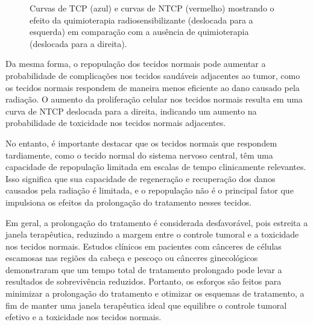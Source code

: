 \documentclass[11pt,a4paper]{article}
\begin{document}
	\begin{figure}[h]
		\centering
		\caption{Curvas de TCP (azul) e curvas de NTCP (vermelho) mostrando o efeito da quimioterapia radiosensibilizante (deslocada para a esquerda) em comparação com a ausência de quimioterapia (deslocada para a direita).}
		\label{fig:tcpNtcpEQT}
	\end{figure}

	Da mesma forma, o repopulação dos tecidos normais pode aumentar a probabilidade de complicações nos tecidos saudáveis adjacentes ao tumor, como os tecidos normais respondem de maneira menos eficiente ao dano causado pela radiação. O aumento da proliferação celular nos tecidos normais resulta em uma curva de NTCP deslocada para a direita, indicando um aumento na probabilidade de toxicidade nos tecidos normais adjacentes.

	No entanto, é importante destacar que os tecidos normais que respondem tardiamente, como o tecido normal do sistema nervoso central, têm uma capacidade de repopulação limitada em escalas de tempo clinicamente relevantes. Isso significa que sua capacidade de regeneração e recuperação dos danos causados pela radiação é limitada, e o repopulação não é o principal fator que impulsiona os efeitos da prolongação do tratamento nesses tecidos.

	Em geral, a prolongação do tratamento é considerada desfavorável, pois estreita a janela terapêutica, reduzindo a margem entre o controle tumoral e a toxicidade nos tecidos normais. Estudos clínicos em pacientes com cânceres de células escamosas nas regiões da cabeça e pescoço ou cânceres ginecológicos demonstraram que um tempo total de tratamento prolongado pode levar a resultados de sobrevivência reduzidos. Portanto, os esforços são feitos para minimizar a prolongação do tratamento e otimizar os esquemas de tratamento, a fim de manter uma janela terapêutica ideal que equilibre o controle tumoral efetivo e a toxicidade nos tecidos normais.
\end{document}
